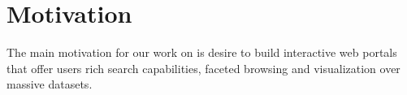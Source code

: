 \section{Motivation}
\label{sec:motivation}
The main motivation for our work on \ldviews is desire to build interactive web portals that offer users rich search capabilities, faceted browsing and visualization over massive datasets.